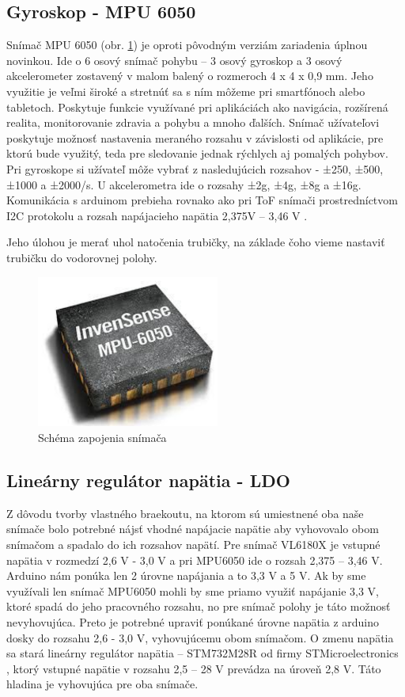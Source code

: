 \subsection{Gyroskop - MPU 6050}
\label{kap:2.2.3}

Snímač MPU 6050 (obr. \ref{OBRAZOK 2.2.3.1}) je oproti pôvodným verziám zariadenia úplnou novinkou. Ide o 6 osový snímač pohybu – 3 osový gyroskop a 3 osový akcelerometer zostavený v malom balený o rozmeroch 4 x 4 x 0,9 mm. Jeho využitie je veľmi široké a stretnúť sa s ním môžeme pri smartfónoch alebo tabletoch. Poskytuje funkcie využívané pri aplikáciách ako navigácia, rozšírená realita, monitorovanie zdravia a pohybu a mnoho ďalších. Snímač užívateľovi poskytuje možnosť nastavenia meraného rozsahu v závislosti od aplikácie, pre ktorú bude využitý, teda pre sledovanie jednak rýchlych aj pomalých pohybov. Pri gyroskope si užívateľ môže vybrať z nasledujúcich rozsahov - ±250, ±500, ±1000 a ±2000\textdegree /s. U akcelerometra ide o rozsahy ±2g, ±4g, ±8g a ±16g.  Komunikácia s arduinom prebieha rovnako ako pri ToF snímači prostredníctvom I2C protokolu a rozsah napájacieho napätia 2,375V – 3,46 V \cite{MPU6050}.  

Jeho úlohou je merať uhol natočenia trubičky, na základe čoho vieme nastaviť trubičku do vodorovnej polohy.  

\begin{figure}[]
	\centering
	\includegraphics[width=60mm]{obr/MPU6050.eps}
	\caption{Schéma zapojenia snímača}\label{OBRAZOK 2.2.3.1} 
\end{figure} 


\subsection{Lineárny regulátor napätia - LDO}
\label{kap:2.2.4}

Z dôvodu tvorby vlastného braekoutu, na ktorom sú umiestnené oba naše snímače bolo potrebné nájsť vhodné napájacie napätie aby vyhovovalo obom snímačom a spadalo do ich rozsahov napätí. Pre snímač VL6180X je vstupné napätia v rozmedzí 2,6 V - 3,0 V \cite{VL6180X} a pri MPU6050 ide o rozsah 2,375 – 3,46 V\cite{MPU6050}. Arduino nám ponúka len 2 úrovne napájania a to 3,3 V a 5 V. Ak by sme využívali len snímač MPU6050 mohli by sme priamo využiť napájanie 3,3 V, ktoré spadá do jeho pracovného rozsahu, no pre snímač polohy je táto možnosť nevyhovujúca. Preto je potrebné upraviť ponúkané úrovne napätia z arduino dosky do rozsahu 2,6 - 3,0 V, vyhovujúcemu obom snímačom. O zmenu napätia sa stará lineárny regulátor napätia – STM732M28R od firmy STMicroelectronics , ktorý vstupné napätie v rozsahu 2,5 – 28 V prevádza na úroveň 2,8 V. Táto hladina je vyhovujúca pre oba snímače.   

